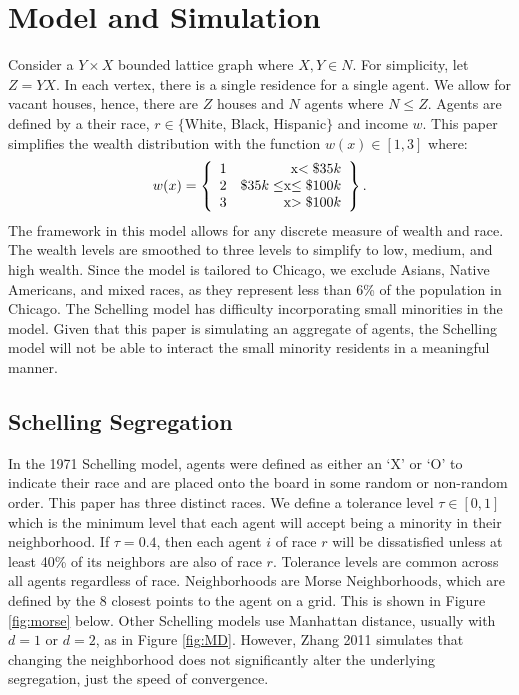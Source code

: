 \documentclass[11pt]{asaproc}
\newcommand{\1}{\mathbb{1}}
\begin{document}
\section{Model and Simulation}

Consider a $Y \times X$ bounded lattice graph where $X,Y \in N$. For simplicity, let $Z = YX$. In each vertex, there is a single residence for a single agent. We allow for vacant houses, hence, there are $Z$ houses and $N$ agents where $N \leq Z$. Agents are defined by a their race, $r\in\{$White, Black, Hispanic$\}$ and income $w$. This paper simplifies the wealth distribution with the function $w(x)\in[1,3]$ where:  
\begin{equation}
\label{eq:w}
    w(x) = \left\{\begin{array}{lr}
        1 & $x$<\$35k\\
        2 & \$35k \leq $x$ \leq \$100k\\
        3 & $x$ >\$100k
        \end{array}\right\}.
\end{equation}
The framework in this model allows for any discrete measure of wealth and race. The wealth levels are smoothed to three levels to simplify to low, medium, and high wealth. Since the model is tailored to Chicago, we exclude Asians, Native Americans, and mixed races, as they represent less than 6\% of the population in Chicago. The Schelling model has difficulty incorporating small minorities in the model. Given that this paper is simulating an aggregate of agents, the Schelling model will not be able to interact the small minority residents in a meaningful manner.

\subsection{Schelling Segregation}
In the 1971 Schelling model, agents were defined as either an `X' or `O' to indicate their race and are placed onto the board in some random or non-random order. This paper has three distinct races. We define a tolerance level $\tau\in[0,1]$ which is the minimum level that each agent will accept being a minority in their neighborhood. If $\tau = 0.4$, then each agent $i$ of race $r$ will be dissatisfied unless at least 40\% of its neighbors are also of race $r$. Tolerance levels are common across all agents regardless of race. Neighborhoods are Morse Neighborhoods, which are defined by the 8 closest points to the agent on a grid. This is shown in Figure \ref{fig:morse} below. Other Schelling models use Manhattan distance, usually with $d=1$ or $d=2$, as in Figure \ref{fig:MD}. However, Zhang 2011 simulates that changing the neighborhood does not significantly alter the underlying segregation, just the speed of convergence\citep{zhang11}. 
\end{document}
